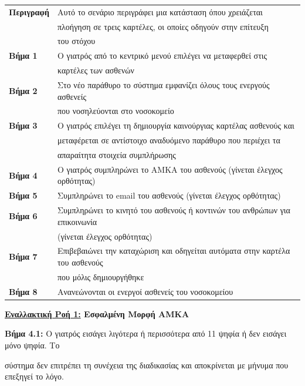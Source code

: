 \documentclass{article}
\newcommand\T{\rule{0pt}{2.6ex}}       %
\newcommand\B{\rule[-1.2ex]{0pt}{0pt}}
\begin{document}
  \begin{center}
     \begin{tabular}{|l|l|}
     \hline
      \textbf{Περιγραφή} & Αυτό το σενάριο περιγράφει μια κατάσταση όπου χρειάζεται \T \\& πλοήγηση σε τρεις καρτέλες, οι οποίες οδηγούν στην επίτευξη \\& του στόχου \B \\ 
      \hline
      \textbf{Βήμα 1} & Ο γιατρός από το κεντρικό μενού επιλέγει να μεταφερθεί στις \T \\& καρτέλες των ασθενών \B \\
      \hline
      \textbf{Βήμα 2} & Στο νέο παράθυρο το σύστημα εμφανίζει όλους τους ενεργούς ασθενείς\T \\& που νοσηλεύονται στο νοσοκομείο \B\\
      \hline
      \textbf{Βήμα 3} & Ο γιατρός επιλέγει τη δημιουργία καινούργιας καρτέλας ασθενούς και \T \\& μεταφέρεται σε αντίστοιχο αναδυόμενο παράθυρο που περιέχει τα \\& απαραίτητα στοιχεία συμπλήρωσης \B \\
      \hline
      \textbf{Βήμα 4} & Ο γιατρός συμπληρώνει το ΑΜΚΑ του ασθενούς (γίνεται έλεγχος ορθότητας) \T\B \\
      \hline
      \textbf{Βήμα 5} & Συμπληρώνει το email του ασθενούς (γίνεται έλεγχος ορθότητας) \T\B \\
      \hline
      \textbf{Βήμα 6} & Συμπληρώνει το κινητό του ασθενούς ή κοντινών του ανθρώπων για επικοινωνία \T \\& (γίνεται έλεγχος ορθότητας) \B \\
      \hline
      \textbf{Βήμα 7} & Επιβεβαιώνει την καταχώριση και οδηγείται αυτόματα στην καρτέλα του ασθενούς \T \\& που μόλις δημιουργήθηκε \B \\
      \hline
      \textbf{Βήμα 8} & Ανανεώνονται οι ενεργοί ασθενείς του νοσοκομείου \T\B \\
      \hline
     \end{tabular}
 \end{center}
 
\textbf{\underline{Εναλλακτική Ροή 1:} Εσφαλμένη Μορφή ΑΜΚΑ} \vspace{0.2cm}
\par \textbf{Βήμα 4.1:} Ο γιατρός εισάγει λιγότερα ή περισσότερα από 11 ψηφία ή δεν εισάγει μόνο ψηφία. Το \par σύστημα δεν επιτρέπει τη συνέχεια της διαδικασίας και αποκρίνεται με μήνυμα που επεξηγεί το λόγο.  \vspace{0.2cm}
\end{document}

